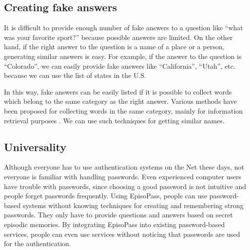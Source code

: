 \documentclass{sigchi}
\begin{document}
\subsection{Creating fake answers}


It is difficult to provide enough number of fake answers to a question like
``what was your favorite sport?''
because possible answers are limited.
%
%
%
On the other hand, if the right answer to the question is a name of a place or a person,
generating similar answers is easy.
For example, if the answer to the question is ``Colorado'',
we can easily provide fake answers like ``California'', ``Utah'', etc.
because we can use the list of states in the U.S.

In this way, fake answers can be easily listed
if it is possible to collect words which belong to the same
category as the right answer.
%
Various methods have been proposed for collecting words in the
same category, mainly for information retrieval purposes
\cite{Huang:2012:LFC:2426725.2426728}%
\cite{BooWa}%
\cite{Wang:2007:LSE:1441428.1442086}.%
We can use such techniques for getting similar names.

\subsection{Universality}

Although everyone has to use authentication systems on the Net these days,
not everyone is familiar with handling passwords.
Even experienced computer users have trouble with passwords,
since choosing a good password is not intuitive and
people forget passwords frequently.
%
Using EpisoPass, people can use password-based systems without knowing
techniques for creating and remembering strong passwords.
They only have to provide
questions and answers based on secret episodic memories.
%
By integrating EpisoPass into existing password-based services,
people can even use services without noticing that passwords are
used for the authentication.
\end{document}

